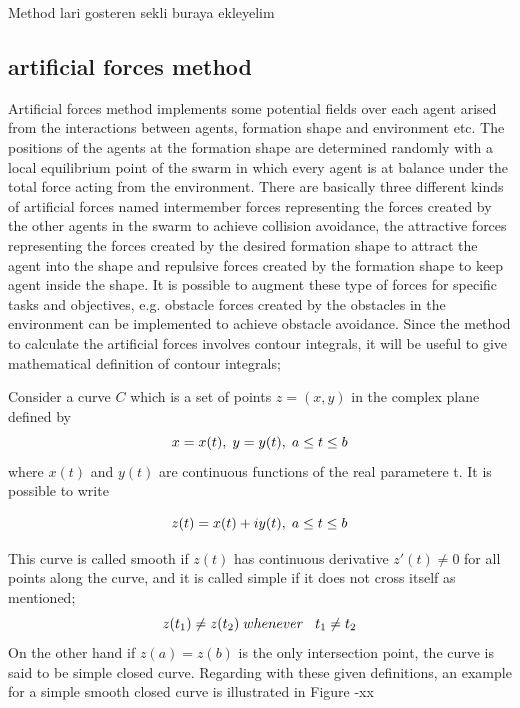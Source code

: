 \documentclass[twoside]{article}
\begin{document}
		Method lari gosteren sekli buraya ekleyelim
		
		
		\subsection{artificial forces method}
		Artificial forces method implements some potential fields over each agent arised from the interactions between agents, formation shape and environment etc. The positions of the agents at the formation shape  are determined randomly with a local equilibrium point of the swarm in which every agent is at balance under the total force acting from the environment. There are basically three different kinds of artificial forces named intermember forces representing the forces created by the other agents in the swarm to achieve collision avoidance, the attractive forces representing the forces created by the desired formation shape to attract the agent into the shape and repulsive forces created by the formation shape to keep agent inside the shape. It is possible to augment these type of forces for specific tasks and objectives, e.g. obstacle forces created by the obstacles in the environment can be implemented to achieve obstacle avoidance.
		Since the method to calculate the artificial forces involves contour integrals, it will be useful to give mathematical definition of contour integrals;
		
		Consider a curve $C$ which is a set of points $z = (x,y)$ in the complex plane defined by
		\begin{equation}
x = x(t),   \hspace{0.1cm} y = y(t),  \hspace{0.1cm} a\leq t \leq b
		\end{equation}
		where $x(t)$ and $y(t)$ are continuous functions of the real parametere t.  It is possible to write
		
		\begin{equation}
z(t) = x(t)+iy(t),   \hspace{0.1cm} a\leq t \leq b
		\end{equation}
		
		This curve is called smooth if $z(t)$ has continuous derivative $z'(t) \neq 0$ for all points along the curve, and it is called simple if it does not cross itself as mentioned;
		\begin{equation}
z(t_1) \neq z(t_2)   \hspace{0.1cm} whenever   \hspace{0.3cm} t_1\neq t_2
		\end{equation}
		On the other hand if  $z(a)=z(b)$ is the only intersection point, the curve is said to be simple closed curve. Regarding with these given definitions, an example for a  simple smooth closed curve is illustrated in Figure -xx
		
\end{document}

